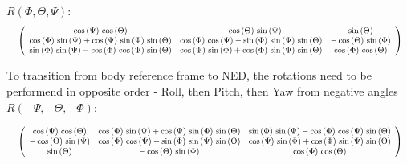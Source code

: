 $R(\Phi, \Theta, \Psi):$
\newline
\newline
\begin{displaymath}
\resizebox{1.0\textwidth}{!}{
$\left(\begin{array}{ccc}
\cos \left(\Psi \right)\,\cos \left(\Theta \right) & -\cos \left(\Theta \right)\,\sin \left(\Psi \right) & \sin \left(\Theta \right)\\
\cos \left(\Phi \right)\,\sin \left(\Psi \right)+\cos \left(\Psi \right)\,\sin \left(\Phi \right)\,\sin \left(\Theta \right) & \cos \left(\Phi \right)\,\cos \left(\Psi \right)-\sin \left(\Phi \right)\,\sin \left(\Psi \right)\,\sin \left(\Theta \right) & -\cos \left(\Theta \right)\,\sin \left(\Phi \right)\\
\sin \left(\Phi \right)\,\sin \left(\Psi \right)-\cos \left(\Phi \right)\,\cos \left(\Psi \right)\,\sin \left(\Theta \right) & \cos \left(\Psi \right)\,\sin \left(\Phi \right)+\cos \left(\Phi \right)\,\sin \left(\Psi \right)\,\sin \left(\Theta \right) & \cos \left(\Phi \right)\,\cos \left(\Theta \right)
\end{array}\right)$}
\end{displaymath}

To transition from body reference frame to NED, the rotations need to be performend in opposite order - Roll, then Pitch, then Yaw from negative angles
 $R( -\Psi, -\Theta ,-\Phi):$ 

\begin{displaymath}
\resizebox{1.0\textwidth}{!}{
$\left(\begin{array}{ccc}
\cos \left(\Psi \right)\,\cos \left(\Theta \right) & \cos \left(\Phi \right)\,\sin \left(\Psi \right)+\cos \left(\Psi \right)\,\sin \left(\Phi \right)\,\sin \left(\Theta \right) & \sin \left(\Phi \right)\,\sin \left(\Psi \right)-\cos \left(\Phi \right)\,\cos \left(\Psi \right)\,\sin \left(\Theta \right)\\
-\cos \left(\Theta \right)\,\sin \left(\Psi \right) & \cos \left(\Phi \right)\,\cos \left(\Psi \right)-\sin \left(\Phi \right)\,\sin \left(\Psi \right)\,\sin \left(\Theta \right) & \cos \left(\Psi \right)\,\sin \left(\Phi \right)+\cos \left(\Phi \right)\,\sin \left(\Psi \right)\,\sin \left(\Theta \right)\\
\sin \left(\Theta \right) & -\cos \left(\Theta \right)\,\sin \left(\Phi \right) & \cos \left(\Phi \right)\,\cos \left(\Theta \right)
\end{array}\right)$}
\end{displaymath}

